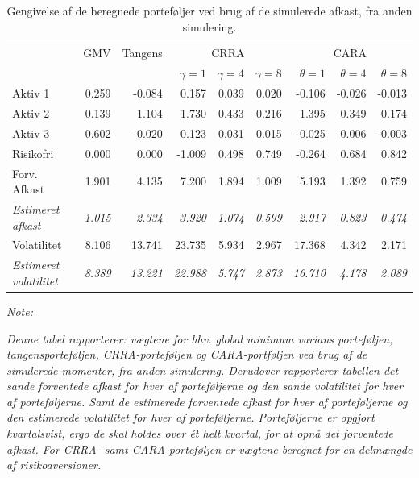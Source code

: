 \documentclass[
  a4paper,
  oneside]{memoir}
\begin{document}
\begin{table}[!h]

\caption{\label{tab:sum-2}Gengivelse af de beregnede porteføljer ved brug af de simulerede afkast, fra anden simulering.}
\centering
\begin{threeparttable}
\begin{tabular}[t]{lrrrrrrrr}
\toprule
\multicolumn{1}{c}{ } & \multicolumn{1}{c}{GMV} & \multicolumn{1}{c}{Tangens} & \multicolumn{3}{c}{CRRA} & \multicolumn{3}{c}{CARA} \\
\cmidrule(l{3pt}r{3pt}){2-2} \cmidrule(l{3pt}r{3pt}){3-3} \cmidrule(l{3pt}r{3pt}){4-6} \cmidrule(l{3pt}r{3pt}){7-9}
  &   &   & $\gamma=1$ & $\gamma=4$ & $\gamma=8$ & $\theta=1$ & $\theta=4$ & $\theta=8$\\
\midrule
\rowcolor{gray!6}  Aktiv 1 & 0.259 & -0.084 & 0.157 & 0.039 & 0.020 & -0.106 & -0.026 & -0.013\\
Aktiv 2 & 0.139 & 1.104 & 1.730 & 0.433 & 0.216 & 1.395 & 0.349 & 0.174\\
\rowcolor{gray!6}  Aktiv 3 & 0.602 & -0.020 & 0.123 & 0.031 & 0.015 & -0.025 & -0.006 & -0.003\\
Risikofri & 0.000 & 0.000 & -1.009 & 0.498 & 0.749 & -0.264 & 0.684 & 0.842\\
\rowcolor{gray!6}  Forv. Afkast & 1.901 & 4.135 & 7.200 & 1.894 & 1.009 & 5.193 & 1.392 & 0.759\\
\em{Estimeret afkast} & \em{1.015} & \em{2.334} & \em{3.920} & \em{1.074} & \em{0.599} & \em{2.917} & \em{0.823} & \em{0.474}\\
\rowcolor{gray!6}  Volatilitet & 8.106 & 13.741 & 23.735 & 5.934 & 2.967 & 17.368 & 4.342 & 2.171\\
\em{Estimeret volatilitet} & \em{8.389} & \em{13.221} & \em{22.988} & \em{5.747} & \em{2.873} & \em{16.710} & \em{4.178} & \em{2.089}\\
\bottomrule
\end{tabular}
\begin{tablenotes}
\item \textit{Note: } 
\item \textit{Denne tabel rapporterer: vægtene for hhv. global minimum varians porteføljen, tangensporteføljen, CRRA-porteføljen og CARA-portføljen ved brug af de simulerede momenter, fra anden simulering. Derudover rapporterer tabellen det sande forventede afkast for hver af porteføljerne og den sande volatilitet for hver af porteføljerne.  Samt de estimerede forventede afkast for hver af porteføljerne og den estimerede volatilitet for hver af porteføljerne. Porteføljerne er opgjort kvartalsvist, ergo de skal holdes over ét helt kvartal, for at opnå det forventede afkast. For CRRA- samt CARA-porteføljen er vægtene beregnet for en delmængde af risikoaversioner.}
\end{tablenotes}
\end{threeparttable}
\end{table}
\end{document}
